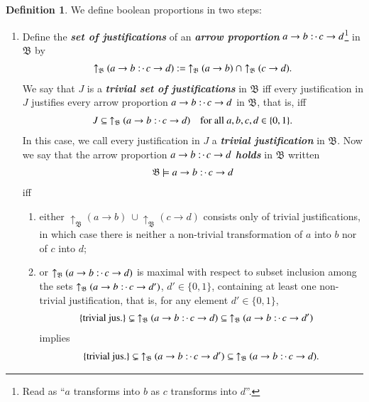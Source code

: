 \documentclass[11pt]{amsart}
\theoremstyle{definition} %
\newtheorem{definition}[theorem]{Definition}
\newcommand{\righttherefore}{:\joinrel\cdot\,}
\begin{document}
\begin{definition} We define boolean proportions in two steps:
\begin{enumerate}
	\item Define the \textit{\textbf{set of justifications}} of an \textit{\textbf{arrow proportion}} $a\to b\righttherefore c\to d$\footnote{Read as ``$a$ transforms into $b$ as $c$ transforms into $d$''.} in $\mathfrak B$ by
	\begin{align*} 
		\uparrow_\mathfrak B(a\to b\righttherefore c\to d):=\ \uparrow_\mathfrak B(a\to b)\ \cap \uparrow_\mathfrak B(c\to d).
	\end{align*} We say that $J$ is a \textit{\textbf{trivial set of justifications}} in $\mathfrak B$ iff every justification in $J$ justifies every arrow proportion $a\to b\righttherefore c\to d$ in $\mathfrak B$, that is, iff
	\begin{align*} 
		J\subseteq\ \uparrow_\mathfrak B(a\to b\righttherefore c\to d)\quad\text{for all $a,b,c,d\in\{0,1\}$.}
	\end{align*} In this case, we call every justification in $J$ a \textit{\textbf{trivial justification}} in $\mathfrak B$. Now we say that the arrow proportion $a\to b\righttherefore c\to d$ \textit{\textbf{holds}} in $\mathfrak B$ written
	\begin{align*} 
		\mathfrak B \models a\to b\righttherefore c\to d
	\end{align*} iff
	\begin{enumerate}
		\item either $\uparrow_\mathfrak B(a\to b)\ \cup \uparrow_\mathfrak B(c\to d)$ consists only of trivial justifications, in which case there is neither a non-trivial transformation of $a$ into $b$ nor of $c$ into $d$;
		\item or $\uparrow_\mathfrak B(a\to b\righttherefore c\to d)$ is maximal with respect to subset inclusion among the sets $\uparrow_\mathfrak B(a\to b\righttherefore c\to d')$, $d'\in\{0,1\}$, containing at least one non-trivial justification, that is, for any element $d'\in \{0,1\}$,
		\begin{align*} 
			\{\text{trivial jus.}\}\subsetneq\ \uparrow_\mathfrak B(a\to b\righttherefore c\to d)&\subseteq\ \uparrow_\mathfrak B(a\to b\righttherefore c\to d')
		\end{align*} implies
		\begin{align*} 
			\{\text{trivial jus.}\}\subsetneq\ \uparrow_\mathfrak B(a\to b\righttherefore c\to d')\subseteq\ \uparrow_\mathfrak B(a\to b\righttherefore c\to d).
		\end{align*}
	\end{enumerate}


\end{enumerate}
\end{definition}
\end{document}
